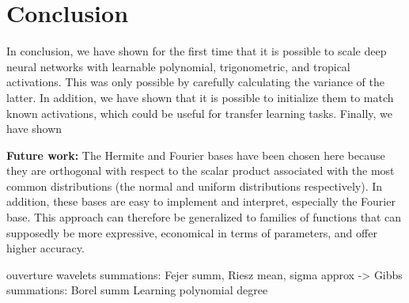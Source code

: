 \documentclass{article} %
\theoremstyle{plain}
\theoremstyle{definition}
\theoremstyle{remark}
\begin{document}


\section{Conclusion}
In conclusion, we have shown for the first time that it is possible to scale deep neural networks with learnable polynomial, trigonometric, and tropical activations. This was only possible by carefully calculating the variance of the latter. In addition, we have shown that it is possible to initialize them to match known activations, which could be useful for transfer learning tasks. Finally, we have shown 

\noindent\textbf{Future work:} The Hermite and Fourier bases have been chosen here because they are orthogonal with respect to the scalar product associated with the most common distributions (the normal and uniform distributions respectively). In addition, these bases are easy to implement and interpret, especially the Fourier base. This approach can therefore be generalized to families of functions that can supposedly be more expressive, economical in terms of parameters, and offer higher accuracy.


ouverture wavelets 
summations: Fejer summ, Riesz mean, sigma approx -> Gibbs
summations: Borel summ
Learning polynomial degree

\fi
\end{document}

